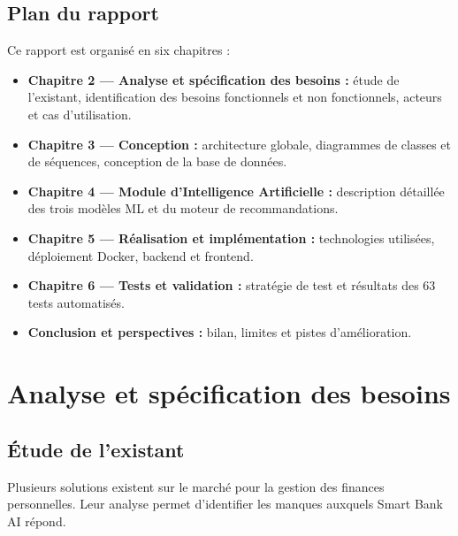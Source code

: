 \documentclass[12pt,a4paper]{report}
\begin{document}
\section{Plan du rapport}

Ce rapport est organisé en six chapitres :

\begin{itemize}[noitemsep]
  \item \textbf{Chapitre 2 — Analyse et spécification des besoins :}
    étude de l'existant, identification des besoins fonctionnels et non
    fonctionnels, acteurs et cas d'utilisation.
  \item \textbf{Chapitre 3 — Conception :} architecture globale,
    diagrammes de classes et de séquences, conception de la base de données.
  \item \textbf{Chapitre 4 — Module d'Intelligence Artificielle :}
    description détaillée des trois modèles ML et du moteur de recommandations.
  \item \textbf{Chapitre 5 — Réalisation et implémentation :}
    technologies utilisées, déploiement Docker, backend et frontend.
  \item \textbf{Chapitre 6 — Tests et validation :}
    stratégie de test et résultats des 63 tests automatisés.
  \item \textbf{Conclusion et perspectives :} bilan, limites et pistes d'amélioration.
\end{itemize}

\chapter{Analyse et spécification des besoins}

\section{Étude de l'existant}

Plusieurs solutions existent sur le marché pour la gestion des finances
personnelles. Leur analyse permet d'identifier les manques auxquels
Smart Bank AI répond.
\end{document}
